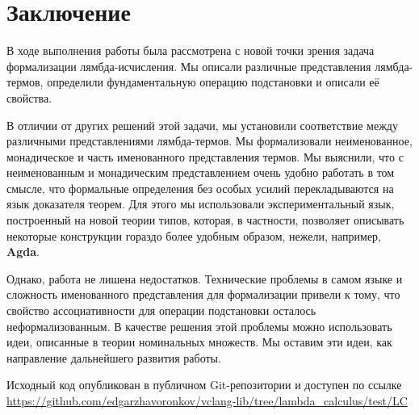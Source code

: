 \section*{Заключение}


В ходе выполнения работы была рассмотрена с новой точки зрения задача формализации лямбда-исчисления. Мы описали различные представления лямбда-термов, определили фундаментальную операцию подстановки и описали её свойства.

В отличии от других решений этой задачи, мы установили соответствие между различными представлениями лямбда-термов. Мы формализовали неименованное, монадическое и часть именованного представления термов. Мы выяснили, что с неименованным и монадическим представлением очень удобно работать в том смысле, что формальные определения без особых усилий перекладываются на язык доказателя теорем. Для этого мы использовали экспериментальный язык, построенный на новой теории типов, которая, в частности, позволяет описывать некоторые конструкции гораздо более удобным образом, нежели, например, \textbf{Agda}.

Однако, работа не лишена недостатков. Технические проблемы в самом языке и сложность именованного представления для формализации привели к тому, что свойство ассоциативности для операции подстановки осталось неформализованным. В качестве решения этой проблемы можно использовать идеи, описанные в теории номинальных множеств. Мы оставим эти идеи, как направление дальнейшего развития работы.

Исходный код опубликован в публичном Git-репозитории и доступен по ссылке \url{https://github.com/edgarzhavoronkov/vclang-lib/tree/lambda_calculus/test/LC}
